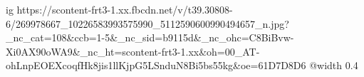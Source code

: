  
 
 
 
 

\ifcmt
  ig https://scontent-frt3-1.xx.fbcdn.net/v/t39.30808-6/269978667_10226583993575990_5112590600990494657_n.jpg?_nc_cat=108&ccb=1-5&_nc_sid=b9115d&_nc_ohc=C8BiBvw-Xi0AX90oWA9&_nc_ht=scontent-frt3-1.xx&oh=00_AT-ohLnpEOEXcoqfHk8jis1llKjpG5LSnduN8Bi5bs55kg&oe=61D7D8D6
  @width 0.4

\fi
